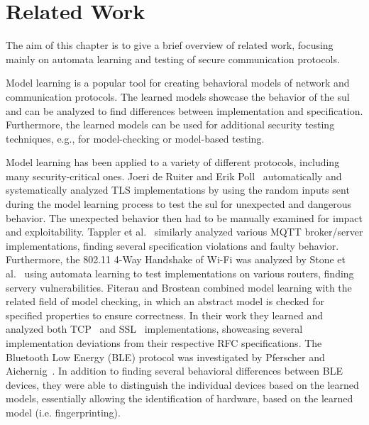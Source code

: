 %
%
% 
% 
% 

\chapter{Related Work}

\label{chap:Related}
The aim of this chapter is to give a brief overview of related work, focusing mainly on automata learning and testing of secure communication protocols.

Model learning is a popular tool for creating behavioral models of network and communication protocols. The learned models showcase the behavior of the \ac{sul} and can be analyzed to find differences between implementation and specification. Furthermore, the learned models can be used for additional security testing techniques, e.g., for model-checking or model-based testing. 

Model learning has been applied to a variety of different protocols, including many security-critical ones. Joeri de Ruiter and Erik Poll~\cite{DBLP:conf/uss/RuiterP15} automatically and systematically analyzed TLS implementations by using the random inputs sent during the model learning process to test the \ac{sul} for unexpected and dangerous behavior. The unexpected behavior then had to be manually examined for impact and exploitability. Tappler et al.~\cite{DBLP:conf/icst/TapplerAB17} similarly analyzed various MQTT broker/server implementations, finding several specification violations and faulty behavior. Furthermore, the 802.11 4-Way Handshake of Wi-Fi was analyzed by Stone et al.~\cite{DBLP:conf/esorics/StoneCR18} using automata learning to test implementations on various routers, finding servery vulnerabilities.
Fiterau and Brostean combined model learning with the related field of model checking, in which an abstract model is checked for specified properties to ensure correctness. In their work they learned and analyzed both TCP~\cite{DBLP:conf/cav/Fiterau-Brostean16} and SSL~\cite{DBLP:conf/spin/Fiterau-Brostean17} implementations, showcasing several implementation deviations from their respective RFC specifications.
The Bluetooth Low Energy (BLE) protocol was investigated by Pferscher and Aichernig~\cite{pferscher2021fingerprinting}. In addition to finding several behavioral differences between BLE devices, they were able to distinguish the individual devices based on the learned models, essentially allowing the identification of hardware, based on the learned model (i.e. fingerprinting).

